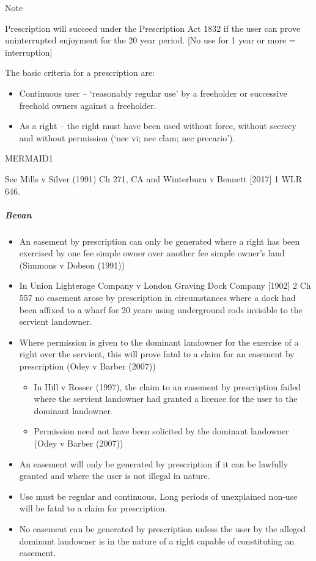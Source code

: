 \documentclass[
]{article}
\providecommand{\tightlist}{%
  \setlength{\itemsep}{0pt}\setlength{\parskip}{0pt}}
\newenvironment{env-881a4bd6-779e-4404-ae5b-86f77846f864}
{
    \savenotes\tcolorbox[blanker,breakable,left=5pt,borderline west={2pt}{-4pt}{blue}]
}
{
    \endtcolorbox\spewnotes
}
\begin{document}
\begin{env-881a4bd6-779e-4404-ae5b-86f77846f864}

Note

Prescription will succeed under the Prescription Act 1832 if the user
can prove uninterrupted enjoyment for the 20 year period. {[}No use for
1 year or more = interruption{]}

\end{env-881a4bd6-779e-4404-ae5b-86f77846f864}

The basic criteria for a prescription are:

\begin{itemize}
\tightlist
\item
  Continuous user -- `reasonably regular use' by a freeholder or
  successive freehold owners against a freeholder.
\item
  As a right -- the right must have been used without force, without
  secrecy and without permission (`nec vi; nec clam; nec precario').
\end{itemize}

MERMAID1

See Mills v Silver (1991) Ch 271, CA and Winterburn v Bennett {[}2017{]}
1 WLR 646.

\hypertarget{bevan}{%
\subparagraph{Bevan}\label{bevan}}

\begin{itemize}
\tightlist
\item
  An easement by prescription can only be generated where a right has
  been exercised by one fee simple owner over another fee simple owner's
  land (Simmons v Dobson (1991))
\item
  In Union Lighterage Company v London Graving Dock Company {[}1902{]} 2
  Ch 557 no easement arose by prescription in circumstances where a dock
  had been affixed to a wharf for 20 years using underground rods
  invisible to the servient landowner.
\item
  Where permission is given to the dominant landowner for the exercise
  of a right over the servient, this will prove fatal to a claim for an
  easement by prescription (Odey v Barber (2007))

  \begin{itemize}
  \tightlist
  \item
    In Hill v Rosser (1997), the claim to an easement by prescription
    failed where the servient landowner had granted a licence for the
    user to the dominant landowner.
  \item
    Permission need not have been solicited by the dominant landowner
    (Odey v Barber (2007))
  \end{itemize}
\item
  An easement will only be generated by prescription if it can be
  lawfully granted and where the user is not illegal in nature.
\item
  Use must be regular and continuous. Long periods of unexplained
  non-use will be fatal to a claim for prescription.
\item
  No easement can be generated by prescription unless the user by the
  alleged dominant landowner is in the nature of a right capable of
  constituting an easement.
\end{itemize}
\end{document}
